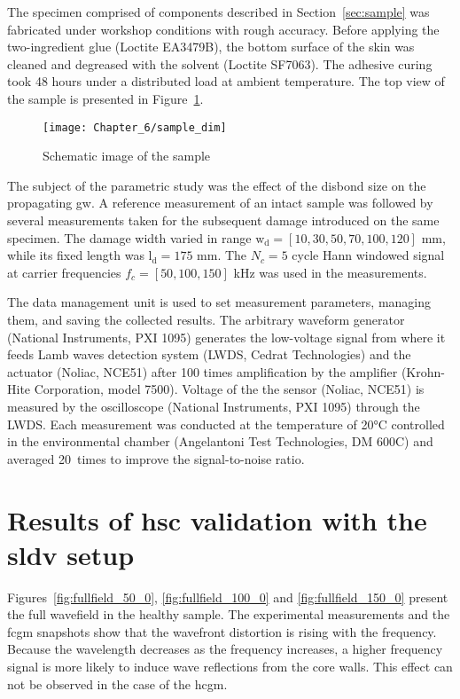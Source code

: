 \documentclass[11pt,a4paper,final]{report}
\theoremstyle{plain}
\begin{document}
The specimen comprised of components described in Section~\ref{sec:sample} was fabricated under workshop conditions with rough accuracy.
Before applying the two-ingredient glue (Loctite EA3479B), the bottom surface of the skin was cleaned and degreased with the solvent (Loctite SF7063).
The adhesive curing took 48 hours under a distributed load at ambient temperature.
The top view of the sample is presented in Figure~\ref{fig:sample_dim}.
\begin{figure}[!htb]
	\begin{center}
		\texttt{[image: Chapter\_6/sample\_dim]}
	\end{center}
	\caption{Schematic image of the sample}
	\label{fig:sample_dim}
\end{figure}

The subject of the parametric study was the effect of the disbond size on the propagating \ac{gw}.
A reference measurement of an intact sample was followed by several measurements taken for the subsequent damage introduced on the same specimen.
The damage width varied in range \(\mathrm{w_d}=\left [10, 30, 50, 70, 100, 120 \right ]\) \unit{\mm}, while its fixed length was \(\mathrm{l_d} = 175\) \unit{\mm}.
The \(N_c=5\) cycle Hann windowed signal at carrier frequencies \(f_c=[50,100,150]\) \unit{\kHz} was used in the measurements.

The data management unit is used to set measurement parameters, managing them, and saving the collected results.
The arbitrary waveform generator (National Instruments, PXI 1095) generates the low-voltage signal from where it feeds Lamb waves detection system (LWDS, Cedrat Technologies) and the actuator (Noliac, NCE51) after 100 times amplification by the  amplifier (Krohn-Hite Corporation, model 7500).
Voltage of the the sensor (Noliac, NCE51) is measured by the oscilloscope (National Instruments, PXI 1095) through the LWDS.
Each measurement was conducted at the temperature of 20\unit{\degreeCelsius} controlled in the environmental chamber (Angelantoni Test Technologies, DM 600C) and averaged 20~times to improve the signal-to-noise ratio. \section{Results of \acl{hsc} validation with the \acl{sldv} setup}
\label{sec:resuls_sldv}
Figures~\ref{fig:fullfield_50_0}, \ref{fig:fullfield_100_0} and \ref{fig:fullfield_150_0} present the full wavefield in the healthy sample.
The experimental measurements and the \ac{fcgm} snapshots show that the wavefront distortion is rising with the frequency.
Because the wavelength decreases as the frequency increases, a higher frequency signal is more likely to induce wave reflections from the core walls.
This effect can not be observed in the case of the \ac{hcgm}.
\end{document}
